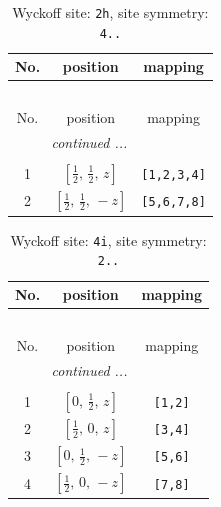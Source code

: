 \documentclass[fleqn,8pt]{jsarticle}
\begin{document}
\begin{longtable}{ccc}
\caption{Wyckoff site: {\tt 2h}, site symmetry: {\tt 4..}}
 \\
 \hline \hline
No. & position & mapping \\ \hline \endfirsthead

\multicolumn{2}{l}{\tablename\ \thetable{}} \\
 \hline \hline
No. & position & mapping \\ \hline \endhead

 \hline \hline
\multicolumn{2}{r}{\footnotesize\it continued ...} \\ \endfoot

 \hline \hline
\multicolumn{2}{r}{} \\ \endlastfoot

1 & $\left[ \frac{1}{2},\, \frac{1}{2},\, z \right]$ & {\tt [1,2,3,4]} \\ \hline
2 & $\left[ \frac{1}{2},\, \frac{1}{2},\, - z \right]$ & {\tt [5,6,7,8]} \\
\end{longtable}
\renewcommand{\arraystretch}{1.2}
\begin{longtable}{ccc}
\caption{Wyckoff site: {\tt 4i}, site symmetry: {\tt 2..}}
 \\
 \hline \hline
No. & position & mapping \\ \hline \endfirsthead

\multicolumn{2}{l}{\tablename\ \thetable{}} \\
 \hline \hline
No. & position & mapping \\ \hline \endhead

 \hline \hline
\multicolumn{2}{r}{\footnotesize\it continued ...} \\ \endfoot

 \hline \hline
\multicolumn{2}{r}{} \\ \endlastfoot

1 & $\left[ 0,\, \frac{1}{2},\, z \right]$ & {\tt [1,2]} \\ \hline
2 & $\left[ \frac{1}{2},\, 0,\, z \right]$ & {\tt [3,4]} \\ \hline
3 & $\left[ 0,\, \frac{1}{2},\, - z \right]$ & {\tt [5,6]} \\ \hline
4 & $\left[ \frac{1}{2},\, 0,\, - z \right]$ & {\tt [7,8]} \\
\end{longtable}
\renewcommand{\arraystretch}{1.2}
\end{document}
